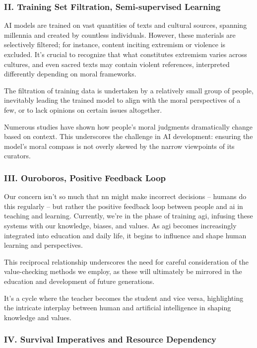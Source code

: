 \documentclass[11pt,a4]{article}
\begin{document}
\subsubsection{II. Training Set Filtration, Semi-supervised Learning}
AI models are trained on vast quantities of texts and cultural sources,
spanning millennia and created by countless individuals. However,
these materials are selectively filtered; for instance, content
inciting extremism or violence is excluded. It's crucial to
recognize that what constitutes extremism varies across cultures,
and even sacred texts may contain violent references, interpreted
differently depending on moral frameworks.
\par
The filtration of training data is undertaken by a relatively
small group of people, inevitably leading the trained model
to align with the moral perspectives of a few, or to lack
opinions on certain issues altogether.
\par
Numerous studies have shown how people's moral judgments
dramatically change based on context. This underscores the
challenge in AI development: ensuring the model's moral
compass is not overly skewed by the narrow
viewpoints of its curators.

\subsubsection{III. Ouroboros, Positive Feedback Loop}
    \par
    Our concern isn't so much that \acrshort{nn} might make incorrect decisions --
    humans do this regularly – but rather the positive feedback loop
    between people and \acrshort{ai} in teaching and learning. Currently,
    we're in the phase of training \acrshort{agi}, infusing these
    systems with our knowledge, biases, and values.
    As \acrshort{agi} becomes increasingly integrated into
    education and daily life, it begins to influence and shape
    human learning and perspectives.
    \par
    This reciprocal relationship underscores the need for
    careful consideration of the value-checking methods
    we employ, as these will ultimately be mirrored in
    the education and development of future generations.
    \par
    It's a cycle where the teacher becomes the student and vice versa,
    highlighting the intricate interplay between human and artificial
    intelligence in shaping knowledge and values.


\subsubsection{IV. Survival Imperatives and Resource Dependency}
\end{document}
